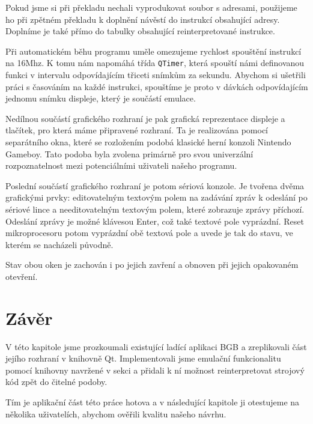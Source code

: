 Pokud jsme si při překladu nechali vyprodukovat soubor s adresami, použijeme ho při zpětném překladu k doplnění návěstí do instrukcí obsahující adresy. Doplníme je také přímo do tabulky obsahující reinterpretované instrukce.

Při automatickém běhu programu uměle omezujeme rychlost spouštění instrukcí na 16Mhz. K tomu nám napomáhá třída \texttt{QTimer}, která spouští námi definovanou funkci v intervalu odpovídajícím třiceti snímkům za sekundu. Abychom si ušetřili práci s časováním na každé instrukci, spouštíme je proto v dávkách odpovídajícím jednomu snímku displeje, který je součástí emulace.

Nedílnou součástí grafického rozhraní je pak grafická reprezentace displeje a tlačítek, pro která máme připravené rozhraní. Ta je realizována pomocí separátního okna, které se rozložením podobá klasické herní konzoli Nintendo Gameboy. Tato podoba byla zvolena primárně pro svou univerzální rozpoznatelnost mezi potenciálními uživateli našeho programu.


Poslední součástí grafického rozhraní je potom sériová konzole. Je tvořena dvěma grafickými prvky: editovatelným textovým polem na zadávání zpráv k odeslání po sériové lince a needitovatelným textovým polem, které zobrazuje zprávy příchozí. Odeslání zprávy je možné klávesou Enter, což také textové pole vyprázdní. Reset mikroprocesoru potom vyprázdní obě textová pole a uvede je tak do stavu, ve kterém se nacházeli původně.


Stav obou oken je zachován i po jejich zavření a obnoven při jejich opakovaném otevření.

\section{Závěr}

V této kapitole jsme prozkoumali existující ladící aplikaci BGB a zreplikovali část jejího rozhraní v knihovně Qt. Implementovali jsme emulační funkcionalitu pomocí knihovny navržené v sekci  a přidali k ní možnost reinterpretovat strojový kód zpět do čitelné podoby.

Tím je aplikační část této práce hotova a v následující kapitole ji otestujeme na několika uživatelích, abychom ověřili kvalitu našeho návrhu.